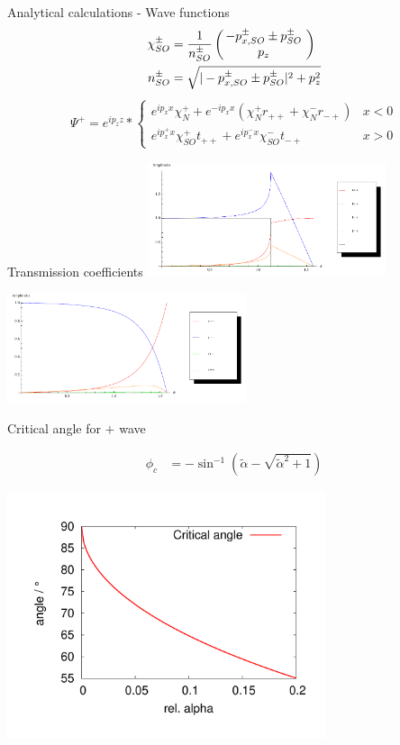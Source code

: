 \documentclass{beamer}
\newcommand{\vect}[2]{\ensuremath{\inp{\hspace{-.8ex}\begin{array}{c}#1\\#2\end{array}\hspace{-.4ex}}}}
\newcommand{\inp}[1]{\ensuremath{\left(#1\right)}}
\newcommand{\ta}{\ensuremath{\tilde\alpha}}
\begin{document}
\begin{frame}{Analytical calculations - Wave functions}
    \begin{align*}
    \chi_{SO}^{\pm} &= \frac{1}{n_{SO}^{\pm}} 
                        \vect{-p_{x,SO}^{\pm} \pm p_{SO}^\pm}{p_z} \\
        n_{SO}^{\pm}   &= \sqrt{|-p_{x,SO}^{\pm} \pm p_{SO}^\pm|^2 +
            p_z^2}
    \end{align*}
    \pause
    \begin{align*}
        \Psi^+ = e^{i p_z z} * \left\{
            \begin{array}{ll}
                e^{i p_x x} \chi_N^+ + e^{- i p_x x} (\chi_N^+ r_{++} +
                        \chi_N^- r_{-+})    & x < 0\\
                e^{i p_x^+ x} \chi_{SO}^+ t_{++} + e^{i p_x^- x}
                \chi_{SO}^- t_{-+}          & x > 0
            \end{array} \right.
    \end{align*}

\end{frame}

\begin{frame}{Transmission coefficients}
    \includegraphics[width=7.0cm]{zero-plus.pdf}

    \includegraphics[width=7.0cm]{zero-minus.pdf}
\end{frame}

\begin{frame}{Critical angle for $+$ wave}
    \begin{center}
        \begin{align*}
            \phi_c          &= -\sin ^{-1}\left(\ta-\sqrt{\ta^2+1}\right)
        \end{align*}

        \includegraphics[width=0.7\textwidth]{critical-angle.pdf}
    \end{center}
\end{frame}
\end{document}
